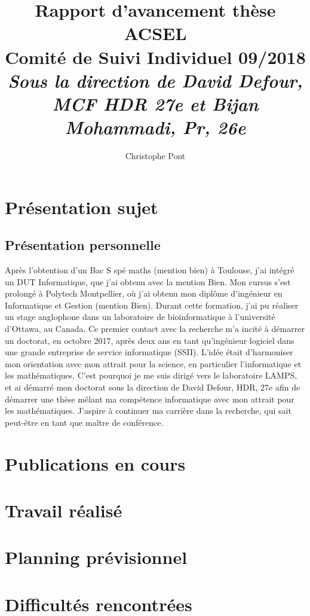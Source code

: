 \documentclass[a4paper,11pt]{report}
\title{%
  Rapport d'avancement thèse ACSEL \\
  \large Comité de Suivi Individuel 09/2018 \\ %
  \large \textit{Sous la direction de David Defour, MCF HDR 27e et Bijan Mohammadi, Pr, 26e}}
\author{Christophe Pont}
\begin{document}
\maketitle
\tableofcontents

\begin{abstract}
\end{abstract}

\chapter{Présentation sujet}

\section{Présentation personnelle}
Après l’obtention d’un Bac S spé maths (mention bien) à Toulouse, j’ai intégré un DUT Informatique, que j'ai obtenu avec la mention Bien. Mon cursus s’est prolongé à Polytech Montpellier, où j’ai obtenu mon diplôme d’ingénieur en Informatique et Gestion (mention Bien). Durant cette formation, j’ai pu réaliser un stage anglophone dans un laboratoire de bioinformatique à l’université d’Ottawa, au Canada. Ce premier contact avec la recherche m’a incité à démarrer un doctorat, en octobre 2017, après deux ans en tant qu’ingénieur logiciel dans une grande entreprise de service informatique (SSII). L’idée était d’harmoniser mon orientation avec mon attrait pour la science, en particulier l’informatique et les mathématiques. C’est pourquoi je me suis dirigé vers le laboratoire LAMPS, et ai démarré mon doctorat sous la direction de David Defour, HDR, 27e afin de démarrer une thèse mêlant ma compétence informatique avec mon attrait pour les mathématiques. J’aspire à continuer ma carrière dans la recherche, qui sait peut-être en tant que maître de conférence.


\chapter{Publications en cours}
\chapter{Travail réalisé}
\chapter{Planning prévisionnel}
\chapter{Difficultés rencontrées}
\end{document}

